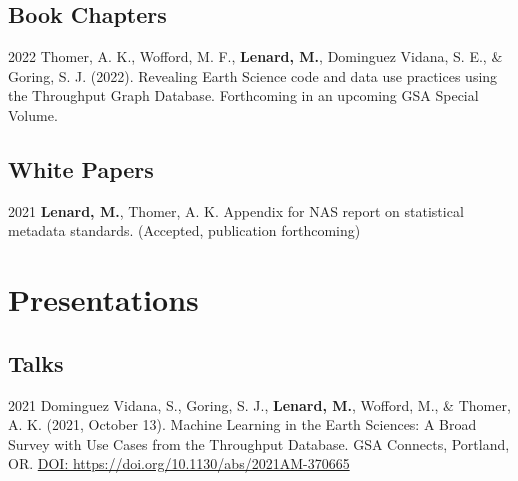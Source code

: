 \documentclass[12pt,letterpaper]{report}
\begin{document}
\subsection*{Book Chapters}

\begin{tablist}

	\item[2022] \tab Thomer, A. K., Wofford, M. F., \textbf{Lenard, M.}, Dominguez Vidana, S. E., \& Goring, S. J. (2022). Revealing Earth Science code and data use practices using the Throughput Graph Database. Forthcoming in an upcoming GSA Special Volume.
	
\end{tablist}

\subsection*{White Papers}

\begin{tablist}

	\item[2021] \tab \textbf{Lenard, M.}, Thomer, A. K. Appendix for NAS report on statistical metadata standards. (Accepted, publication forthcoming)
	
\end{tablist}



\section*{Presentations}

\subsection*{Talks}

\begin{tablist}

	\item[2021] \tab Dominguez Vidana, S., Goring, S. J., \textbf{Lenard, M.}, Wofford, M., \& Thomer, A. K. (2021, October 13). Machine Learning in the Earth Sciences: A Broad Survey with Use Cases from the Throughput Database. GSA Connects, Portland, OR. \href{https://doi.org/10.1130/abs/2021AM-370665}{DOI: https://doi.org/10.1130/abs/2021AM-370665}
	    

\end{tablist}
    
\end{document}
